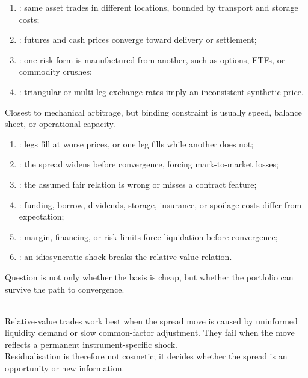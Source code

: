 \documentclass[a4paper,oneside,openany]{book}
\begin{document}
\begin{taxonomy} 
\begin{enumerate}[label=\roman*.]
\setlength{\itemsep}{0pt}
\item {}: same asset trades in different locations, bounded by transport and storage costs;
\item {}: futures and cash prices converge toward delivery or settlement;
\item {}: one risk form is manufactured from another, such as options, ETFs, or commodity crushes;
\item {}: triangular or multi-leg exchange rates imply an inconsistent synthetic price.
\end{enumerate}
Closest to mechanical arbitrage, but binding constraint is usually speed, balance sheet, or operational capacity.
\end{taxonomy}

\begin{taxonomy} 
\begin{enumerate}[label=\roman*.]
\setlength{\itemsep}{0pt}
\item {}: legs fill at worse prices, or one leg fills while another does not;
\item {}: the spread widens before convergence, forcing mark-to-market losses;
\item {}: the assumed fair relation is wrong or misses a contract feature;
\item {}: funding, borrow, dividends, storage, insurance, or spoilage costs differ from expectation;
\item {}: margin, financing, or risk limits force liquidation before convergence;
\item {}: an idiosyncratic shock breaks the relative-value relation.
\end{enumerate}
Question is not only whether the basis is cheap, but whether the portfolio can survive the path to convergence.
\end{taxonomy}

\begin{principle} \\
Relative-value trades work best when the spread move is caused by uninformed liquidity demand or slow common-factor adjustment. They fail when the move reflects a permanent instrument-specific shock.\\
Residualisation is therefore not cosmetic; it decides whether the spread is an opportunity or new information.
\end{principle}
\end{document}
